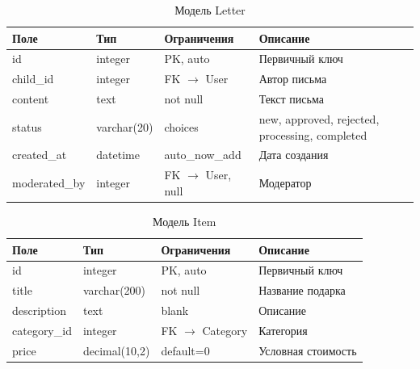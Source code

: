 \documentclass[14pt,a4paper]{extarticle}
\begin{document}
\begin{table}[H]
\centering
\caption{Модель Letter}
\label{tab:dict_letter}
\small
\begin{tabular}{|L{2.5cm}|L{2.5cm}|L{3cm}|L{4.5cm}|}
\hline
\textbf{Поле} & \textbf{Тип} & \textbf{Ограничения} & \textbf{Описание} \\
\hline
id & integer & PK, auto & Первичный ключ \\
\hline
child\_id & integer & FK $\to$ User & Автор письма \\
\hline
content & text & not null & Текст письма \\
\hline
status & varchar(20) & choices & new, approved, rejected, processing, completed \\
\hline
created\_at & datetime & auto\_now\_add & Дата создания \\
\hline
moderated\_by & integer & FK $\to$ User, null & Модератор \\
\hline
\end{tabular}
\end{table}

\begin{table}[H]
\centering
\caption{Модель Item}
\label{tab:dict_item}
\small
\begin{tabular}{|L{2.5cm}|L{2.5cm}|L{3cm}|L{4.5cm}|}
\hline
\textbf{Поле} & \textbf{Тип} & \textbf{Ограничения} & \textbf{Описание} \\
\hline
id & integer & PK, auto & Первичный ключ \\
\hline
title & varchar(200) & not null & Название подарка \\
\hline
description & text & blank & Описание \\
\hline
category\_id & integer & FK $\to$ Category & Категория \\
\hline
price & decimal(10,2) & default=0 & Условная стоимость \\
\hline
\end{tabular}
\end{table}
\end{document}
